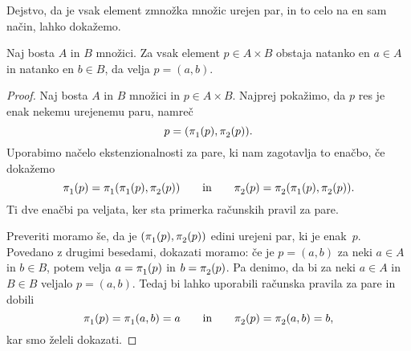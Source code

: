 Dejstvo, da je vsak element zmnožka množic urejen par, in to celo na en sam način, lahko
dokažemo.

\begin{trditev}
  Naj bosta $A$ in $B$ množici. Za vsak element $p \in A \times B$ obstaja natanko en
  $a \in A$ in natanko en $b \in B$, da velja $p = (a, b)$.
\end{trditev}

\begin{proof}
  Naj bosta $A$ in $B$ množici in $p \in A \times B$. Najprej pokažimo, da $p$ res je enak
  nekemu urejenemu paru, namreč
  \begin{equation*}
    p = (\fst(p), \snd(p)).
  \end{equation*}
  Uporabimo načelo ekstenzionalnosti za pare, ki nam zagotavlja to enačbo, če dokažemo
  \begin{equation*}
    \fst(p) = \fst(\fst(p), \snd(p))
    \qquad\text{in}\qquad
    \snd(p) = \snd(\fst(p), \snd(p)).
  \end{equation*}
  Ti dve enačbi pa veljata, ker sta primerka računskih pravil za pare.

  Preveriti moramo še, da je $(\fst(p), \snd(p))$ edini urejeni par, ki je enak~$p$.
  Povedano z drugimi besedami, dokazati moramo: če je $p = (a, b)$ za neki $a \in A$ in
  $b \in B$, potem velja $a = \fst(p)$ in $b = \snd(p)$. Pa denimo, da bi za neki
  $a \in A$ in $B \in B$ veljalo $p = (a,b)$. Tedaj bi lahko uporabili računska pravila za
  pare in dobili
  \begin{equation*}
    \fst(p) = \fst(a, b) = a
    \qquad\text{in}\qquad
    \snd(p) = \snd(a, b) = b,
  \end{equation*}
  kar smo želeli dokazati.
\end{proof}

